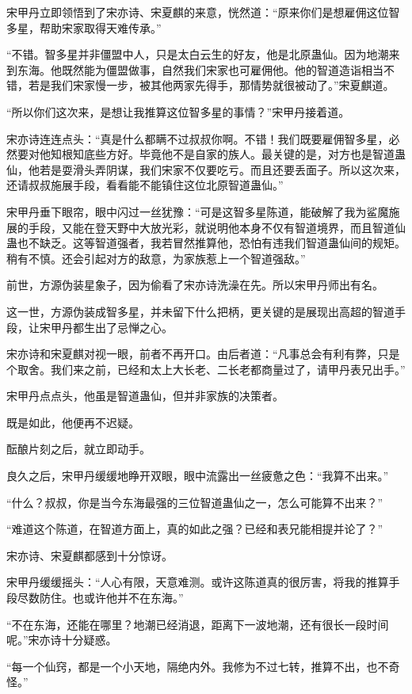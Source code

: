 \begin{this_body}
宋甲丹立即领悟到了宋亦诗、宋夏麒的来意，恍然道：“原来你们是想雇佣这位智多星，帮助宋家取得天难传承。”

“不错。智多星并非僵盟中人，只是太白云生的好友，他是北原蛊仙。因为地潮来到东海。他既然能为僵盟做事，自然我们宋家也可雇佣他。他的智道造诣相当不错，若是我们宋家慢一步，被其他两家先得手，那情势就很被动了。”宋夏麒道。

“所以你们这次来，是想让我推算这位智多星的事情？”宋甲丹接着道。

宋亦诗连连点头：“真是什么都瞒不过叔叔你啊。不错！我们既要雇佣智多星，必然要对他知根知底些方好。毕竟他不是自家的族人。最关键的是，对方也是智道蛊仙，他若是耍滑头弄阴谋，我们宋家不仅要吃亏。而且还要丢面子。所以这次来，还请叔叔施展手段，看看能不能镇住这位北原智道蛊仙。”

宋甲丹垂下眼帘，眼中闪过一丝犹豫：“可是这智多星陈道，能破解了我为鲨魔施展的手段，又能在登天野中大放光彩，就说明他本身不仅有智道境界，而且智道仙蛊也不缺乏。这等智道强者，我若冒然推算他，恐怕有违我们智道蛊仙间的规矩。稍有不慎。还会引起对方的敌意，为家族惹上一个智道强敌。”

前世，方源伪装星象子，因为偷看了宋亦诗洗澡在先。所以宋甲丹师出有名。

这一世，方源伪装成智多星，并未留下什么把柄，更关键的是展现出高超的智道手段，让宋甲丹都生出了忌惮之心。

宋亦诗和宋夏麒对视一眼，前者不再开口。由后者道：“凡事总会有利有弊，只是个取舍。我们来之前，已经和太上大长老、二长老都商量过了，请甲丹表兄出手。”

宋甲丹点点头，他虽是智道蛊仙，但并非家族的决策者。

既是如此，他便再不迟疑。

酝酿片刻之后，就立即动手。

良久之后，宋甲丹缓缓地睁开双眼，眼中流露出一丝疲惫之色：“我算不出来。”

“什么？叔叔，你是当今东海最强的三位智道蛊仙之一，怎么可能算不出来？”

“难道这个陈道，在智道方面上，真的如此之强？已经和表兄能相提并论了？”

宋亦诗、宋夏麒都感到十分惊讶。

宋甲丹缓缓摇头：“人心有限，天意难测。或许这陈道真的很厉害，将我的推算手段尽数防住。也或许他并不在东海。”

“不在东海，还能在哪里？地潮已经消退，距离下一波地潮，还有很长一段时间呢。”宋亦诗十分疑惑。

“每一个仙窍，都是一个小天地，隔绝内外。我修为不过七转，推算不出，也不奇怪。”


\end{this_body}
